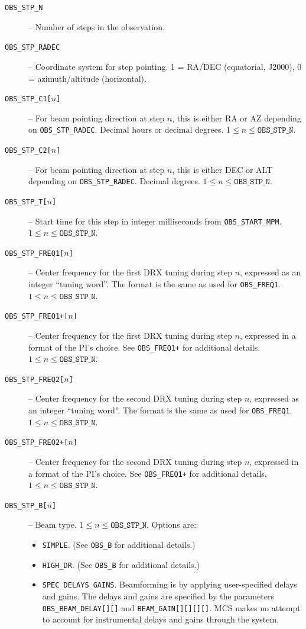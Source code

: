 \begin{description}
\item[\texttt{OBS\_STP\_N}] -- Number of steps in the observation.

\item[\texttt{OBS\_STP\_RADEC}] -- Coordinate system for step pointing.  1 = RA/DEC (equatorial, J2000), 0 = azimuth/altitude (horizontal).

\item[\texttt{OBS\_STP\_C1[$n$]}] -- For beam pointing direction at step $n$, this is either RA or AZ depending on \texttt{OBS\_STP\_RADEC}.  Decimal hours or decimal degrees.  $1 \le n \le \texttt{OBS\_STP\_N}$.

\item[\texttt{OBS\_STP\_C2[$n$]}] -- For beam pointing direction at step $n$, this is either DEC or ALT depending on \texttt{OBS\_STP\_RADEC}.  Decimal degrees.  $1 \le n \le \texttt{OBS\_STP\_N}$.

\item[\texttt{OBS\_STP\_T[$n$]}] -- Start time for this step in integer milliseconds from \texttt{OBS\_START\_MPM}.  $1 \le n \le \texttt{OBS\_STP\_N}$.

\item[\texttt{OBS\_STP\_FREQ1[$n$]}] -- Center frequency for the first DRX tuning during step $n$, expressed as an integer ``tuning word''.  The format is the same as used for \texttt{OBS\_FREQ1}.  $1 \le n \le \texttt{OBS\_STP\_N}$.

\item[\texttt{OBS\_STP\_FREQ1+[$n$]}] -- Center frequency for the first DRX tuning during step $n$, expressed in a format of the PI's choice.  See \texttt{OBS\_FREQ1+} for additional details.  $1 \le n \le \texttt{OBS\_STP\_N}$.

\item[\texttt{OBS\_STP\_FREQ2[$n$]}] -- Center frequency for the second DRX tuning during step $n$, expressed as an integer ``tuning word''.  The format is the same as used for \texttt{OBS\_FREQ1}.  $1 \le n \le \texttt{OBS\_STP\_N}$.

\item[\texttt{OBS\_STP\_FREQ2+[$n$]}] -- Center frequency for the second DRX tuning during step $n$, expressed in a format of the PI's choice.  See \texttt{OBS\_FREQ1+} for additional details.  $1 \le n \le \texttt{OBS\_STP\_N}$.

\item[\texttt{OBS\_STP\_B[$n$]}] -- Beam type.  $1 \le n \le \texttt{OBS\_STP\_N}$.  Options are:
\begin{itemize}
\item \texttt{SIMPLE}.  (See \texttt{OBS\_B} for additional details.)
\item \texttt{HIGH\_DR}.  (See \texttt{OBS\_B} for additional details.)
\item \texttt{SPEC\_DELAYS\_GAINS}.  Beamforming is by applying user-specified delays and gains.  The delays and gains are specified by the parameters \texttt{OBS\_BEAM\_DELAY[][]} and \texttt{BEAM\_GAIN[][][][]}.  MCS makes no attempt to account for instrumental delays and gains through the system.
\end{itemize}


\end{description}
